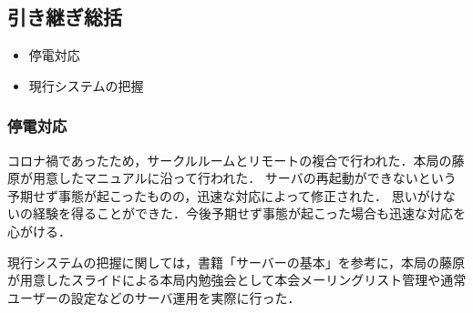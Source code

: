 \subsection*{引き継ぎ総括}


\begin{itemize}
	\item 停電対応
	\item 現行システムの把握
\end{itemize}

\subsubsection*{停電対応}
コロナ禍であったため，サークルルームとリモートの複合で行われた．本局の藤原が用意したマニュアルに沿って行われた．
サーバの再起動ができないという予期せず事態が起こったものの，迅速な対応によって修正された．
思いがけないの経験を得ることができた．今後予期せず事態が起こった場合も迅速な対応を心がける．

現行システムの把握に関しては，書籍「サーバーの基本」を参考に，本局の藤原が用意したスライドによる本局内勉強会として本会メーリングリスト管理や通常ユーザーの設定などのサーバ運用を実際に行った．

